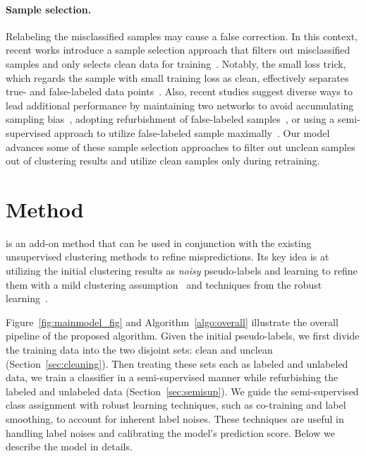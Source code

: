 \documentclass[final]{cvpr}
\newcommand{\model}{\textsf{RUC}}
\begin{document}
\paragraph{Sample selection.} Relabeling the misclassified samples may cause a false correction. In this context, recent works introduce a sample selection approach that filters out misclassified samples and only selects clean data for training~\cite{lyu2019curriculum,malach2017decoupling}. Notably, the small loss trick, which regards the sample with small training loss as clean, effectively separates true- and false-labeled data points~\cite{arpit2017closer,jiang2018mentornet,liu2020early}. Also, recent studies suggest diverse ways to lead additional performance by maintaining two networks to avoid accumulating sampling bias~\cite{han2018co,yu2019does}, adopting refurbishment of false-labeled samples~\cite{song2019selfie}, or using a semi-supervised approach to utilize false-labeled sample maximally~\cite{li2020dividemix}. Our model advances some of these sample selection approaches to filter out unclean samples out of clustering results and utilize clean samples only during retraining. \section{Method}
\text{\model} is an add-on method that can be used in conjunction with the existing unsupervised clustering methods to refine mispredictions. Its key idea is at utilizing the initial clustering results as \emph{noisy} pseudo-labels and learning to refine them with a mild clustering assumption~\cite{Engelen2020survey} and techniques from the robust learning~\cite{li2020dividemix,lukasik2020does}. 

Figure~\ref{fig:mainmodel_fig} and Algorithm~\ref{algo:overall} illustrate the overall pipeline of the proposed algorithm. Given the initial pseudo-labels, we first divide the training data into the two disjoint sets: clean and unclean (Section~\ref{sec:cleaning}). Then treating these sets each as labeled and unlabeled data, we train a classifier in a semi-supervised manner while refurbishing the labeled and unlabeled data (Section~\ref{sec:semisup}). We guide the semi-supervised class assignment with robust learning techniques, such as co-training and label smoothing, to account for inherent label noises. These techniques are useful in handling label noises and calibrating the model's prediction score. Below we describe the model in details.
\end{document}
